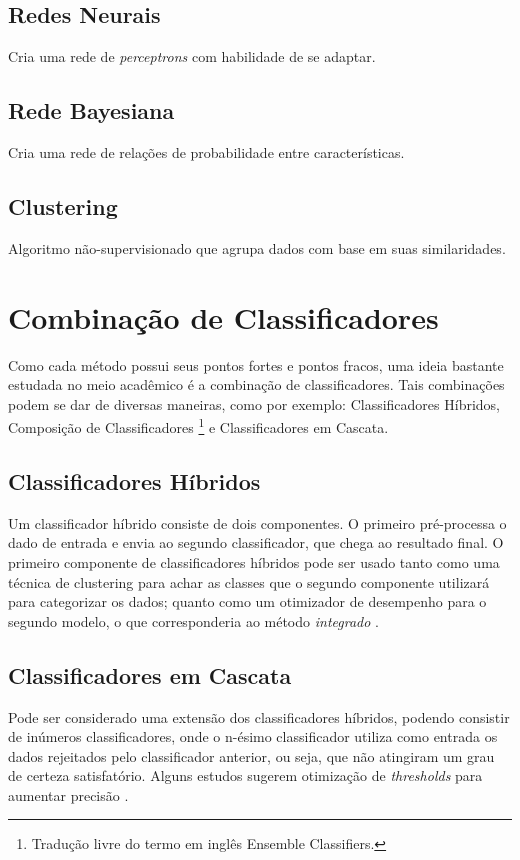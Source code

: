     \subsection{Redes Neurais}
        Cria uma rede de \emph{perceptrons} com habilidade de se adaptar.

    \subsection{Rede Bayesiana}
        Cria uma rede de relações de probabilidade entre características.

    \subsection{Clustering}
        Algoritmo não-supervisionado que agrupa dados com base em suas similaridades.

\section{Combinação de Classificadores}
Como cada método possui seus pontos fortes e pontos fracos, uma ideia bastante estudada no meio acadêmico é a
 combinação de classificadores. Tais combinações podem se dar de diversas maneiras, como por exemplo: Classificadores
 Híbridos, Composição de Classificadores \footnote{Tradução livre do termo em inglês Ensemble Classifiers.} e
 Classificadores em Cascata.

 \subsection{Classificadores Híbridos}
    Um classificador híbrido consiste de dois componentes. O primeiro pré-processa o dado de entrada e envia ao segundo
    classificador, que chega ao resultado final. O primeiro componente de classificadores híbridos pode ser usado tanto
    como uma técnica de clustering para achar as classes que o segundo componente utilizará para categorizar os dados;
    quanto como um otimizador de desempenho para o segundo modelo, o que corresponderia ao método \textit{integrado}
    \cite{aydin09}.


 \subsection{Classificadores em Cascata}
    Pode ser considerado uma extensão dos classificadores híbridos, podendo consistir de inúmeros classificadores, onde
    o n-ésimo classificador utiliza como entrada os dados rejeitados pelo classificador anterior, ou seja, que não
    atingiram um grau de certeza satisfatório. Alguns estudos sugerem otimização de \emph{thresholds} para aumentar precisão
    \cite{oliveira05}.

